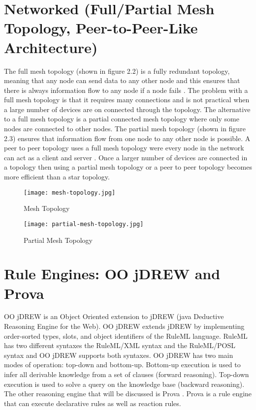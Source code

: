 \documentclass[12pt]{report}
\begin{document}
\section{Networked (Full/Partial Mesh Topology, Peer-to-Peer-Like Architecture)}	
The full mesh topology (shown in figure 2.2) is a fully redundant topology, meaning that any node can send data to any other node and this ensures that there is always information flow to any node if a node fails \cite{Topology}.  The problem with a full mesh topology is that it requires many connections and is not practical when a large number of devices are on connected through the topology.  The alternative to a full mesh topology is a partial connected mesh topology where only some nodes are connected to other nodes.  The partial mesh topology (shown in figure 2.3) ensures that information flow from one node to any other node is possible.  A peer to peer topology uses a full mesh topology were every node in the network can act as a client and server \cite{P2P}.  Once a larger number of devices are connected in a topology then using a partial mesh topology or a peer to peer topology becomes more efficient than a star topology.
\begin{figure}[ht]
\centering
\texttt{[image: mesh-topology.jpg]}
\caption{Mesh Topology}\label{fig:2}
\end{figure}
\begin{figure}[ht]
\centering
\texttt{[image: partial-mesh-topology.jpg]}
\caption{Partial Mesh Topology}\label{fig:3}
\end{figure}

\section{Rule Engines: OO jDREW and Prova}	

OO jDREW \cite{OOjDREW,conf/ruleml/BallBHMS05} is an Object Oriented extension to jDREW (java Deductive Reasoning Engine for the Web).  OO jDREW extends jDREW by implementing order-sorted types, slots, and object identifiers of the RuleML language.  RuleML has two different syntaxes the RuleML/XML syntax and the RuleML/POSL syntax and OO jDREW supports both syntaxes.  OO jDREW has two main modes of operation: top-down and bottom-up.  Bottom-up execution is used to infer all derivable knowledge from a set of clauses (forward reasoning). Top-down execution is used to solve a query on the knowledge base (backward reasoning).  The other reasoning engine that will be discussed is Prova \cite{PROVA}.  Prova is a rule engine that can execute declarative rules as well as reaction rules.
\end{document}
